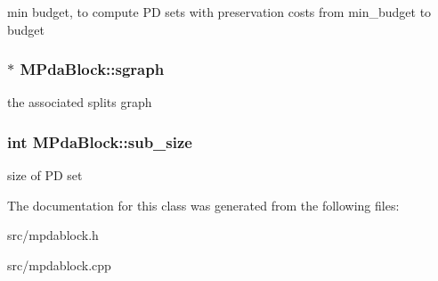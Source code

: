 min budget, to compute PD sets with preservation costs from min\_\-budget to budget \hypertarget{classMPdaBlock_a277cd105fdf1b93184da7deb04279cbb}{
\subsubsection[{sgraph}]{$\ast$ {\bf MPdaBlock::sgraph}}}
\label{classMPdaBlock_a277cd105fdf1b93184da7deb04279cbb}
the associated splits graph \hypertarget{classMPdaBlock_a3a6d616fef6b8dfc9f16e098545c5675}{
\subsubsection[{sub\_\-size}]{\setlength{\rightskip}{0pt plus 5cm}int {\bf MPdaBlock::sub\_\-size}}}
\label{classMPdaBlock_a3a6d616fef6b8dfc9f16e098545c5675}
size of PD set 

The documentation for this class was generated from the following files:\begin{DoxyCompactItemize}
\item 
src/mpdablock.h\item 
src/mpdablock.cpp\end{DoxyCompactItemize}
